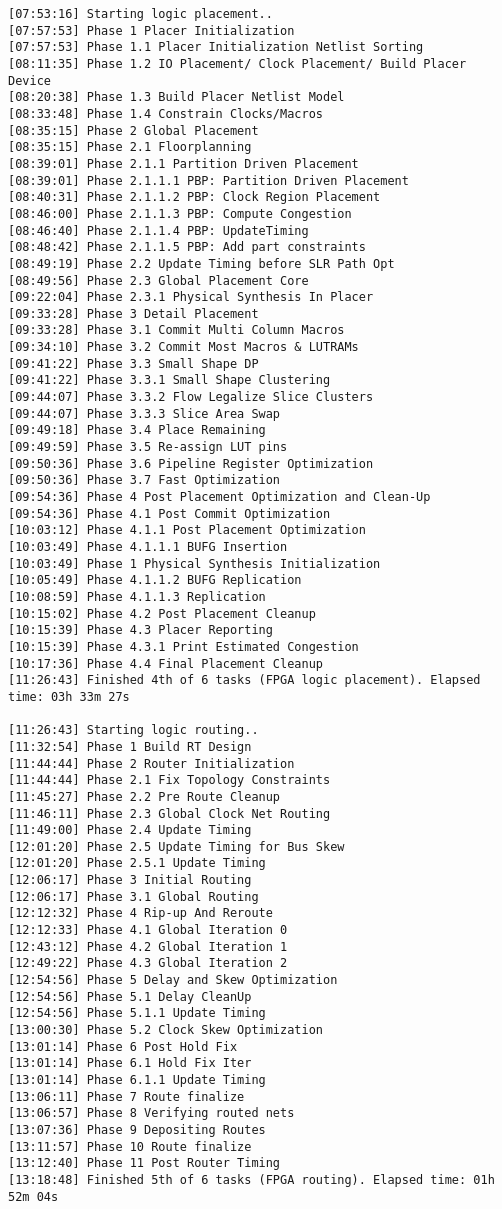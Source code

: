 \begin{center}
\begin{lstlisting}[label=lst:vlog,caption=Файл v++\_vinc.log]
[07:53:16] Starting logic placement..
[07:57:53] Phase 1 Placer Initialization
[07:57:53] Phase 1.1 Placer Initialization Netlist Sorting
[08:11:35] Phase 1.2 IO Placement/ Clock Placement/ Build Placer Device
[08:20:38] Phase 1.3 Build Placer Netlist Model
[08:33:48] Phase 1.4 Constrain Clocks/Macros
[08:35:15] Phase 2 Global Placement
[08:35:15] Phase 2.1 Floorplanning
[08:39:01] Phase 2.1.1 Partition Driven Placement
[08:39:01] Phase 2.1.1.1 PBP: Partition Driven Placement
[08:40:31] Phase 2.1.1.2 PBP: Clock Region Placement
[08:46:00] Phase 2.1.1.3 PBP: Compute Congestion
[08:46:40] Phase 2.1.1.4 PBP: UpdateTiming
[08:48:42] Phase 2.1.1.5 PBP: Add part constraints
[08:49:19] Phase 2.2 Update Timing before SLR Path Opt
[08:49:56] Phase 2.3 Global Placement Core
[09:22:04] Phase 2.3.1 Physical Synthesis In Placer
[09:33:28] Phase 3 Detail Placement
[09:33:28] Phase 3.1 Commit Multi Column Macros
[09:34:10] Phase 3.2 Commit Most Macros & LUTRAMs
[09:41:22] Phase 3.3 Small Shape DP
[09:41:22] Phase 3.3.1 Small Shape Clustering
[09:44:07] Phase 3.3.2 Flow Legalize Slice Clusters
[09:44:07] Phase 3.3.3 Slice Area Swap
[09:49:18] Phase 3.4 Place Remaining
[09:49:59] Phase 3.5 Re-assign LUT pins
[09:50:36] Phase 3.6 Pipeline Register Optimization
[09:50:36] Phase 3.7 Fast Optimization
[09:54:36] Phase 4 Post Placement Optimization and Clean-Up
[09:54:36] Phase 4.1 Post Commit Optimization
[10:03:12] Phase 4.1.1 Post Placement Optimization
[10:03:49] Phase 4.1.1.1 BUFG Insertion
[10:03:49] Phase 1 Physical Synthesis Initialization
[10:05:49] Phase 4.1.1.2 BUFG Replication
[10:08:59] Phase 4.1.1.3 Replication
[10:15:02] Phase 4.2 Post Placement Cleanup
[10:15:39] Phase 4.3 Placer Reporting
[10:15:39] Phase 4.3.1 Print Estimated Congestion
[10:17:36] Phase 4.4 Final Placement Cleanup
[11:26:43] Finished 4th of 6 tasks (FPGA logic placement). Elapsed time: 03h 33m 27s 

[11:26:43] Starting logic routing..
[11:32:54] Phase 1 Build RT Design
[11:44:44] Phase 2 Router Initialization
[11:44:44] Phase 2.1 Fix Topology Constraints
[11:45:27] Phase 2.2 Pre Route Cleanup
[11:46:11] Phase 2.3 Global Clock Net Routing
[11:49:00] Phase 2.4 Update Timing
[12:01:20] Phase 2.5 Update Timing for Bus Skew
[12:01:20] Phase 2.5.1 Update Timing
[12:06:17] Phase 3 Initial Routing
[12:06:17] Phase 3.1 Global Routing
[12:12:32] Phase 4 Rip-up And Reroute
[12:12:33] Phase 4.1 Global Iteration 0
[12:43:12] Phase 4.2 Global Iteration 1
[12:49:22] Phase 4.3 Global Iteration 2
[12:54:56] Phase 5 Delay and Skew Optimization
[12:54:56] Phase 5.1 Delay CleanUp
[12:54:56] Phase 5.1.1 Update Timing
[13:00:30] Phase 5.2 Clock Skew Optimization
[13:01:14] Phase 6 Post Hold Fix
[13:01:14] Phase 6.1 Hold Fix Iter
[13:01:14] Phase 6.1.1 Update Timing
[13:06:11] Phase 7 Route finalize
[13:06:57] Phase 8 Verifying routed nets
[13:07:36] Phase 9 Depositing Routes
[13:11:57] Phase 10 Route finalize
[13:12:40] Phase 11 Post Router Timing
[13:18:48] Finished 5th of 6 tasks (FPGA routing). Elapsed time: 01h 52m 04s 


\end{lstlisting}
\end{center}

